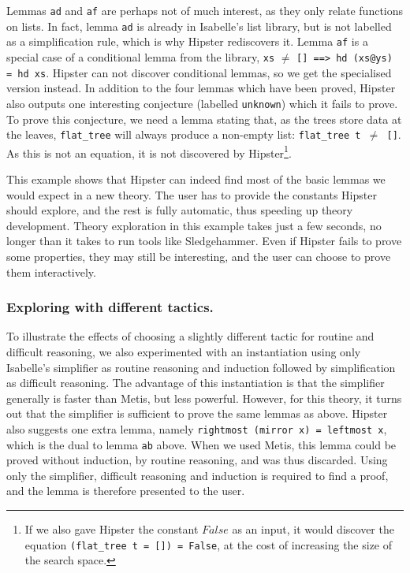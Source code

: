 Lemmas \texttt{ad} and \texttt{af} are perhaps not of much interest,
as they only relate functions on lists. In fact, lemma \texttt{ad} is
already in Isabelle's list library, but is not labelled as a
simplification rule, which is why Hipster rediscovers it. Lemma
\texttt{af} is a special case of a conditional lemma from the library,
\verb|xs| $\neq$ \verb|[] ==> hd (xs@ys) = hd xs|. Hipster can not
discover conditional lemmas, so we get the specialised version instead. In addition to the four lemmas which have been proved, Hipster also outputs one interesting conjecture (labelled \texttt{unknown}) which it fails to prove. To prove this conjecture, we need a lemma stating that, as the trees store data at the leaves, \texttt{flat\_tree} will always produce a non-empty list:
 \texttt{flat\_tree t $\neq$ []}. As this is not an equation, it is
 not discovered by Hipster\footnote{If we also gave Hipster the
   constant $False$ as an input, it would discover the equation
  \texttt{(flat\_tree t = []) = False}, at the cost of increasing
  the size of the search space.}.
 
This example shows that Hipster can indeed find most of the basic lemmas we would expect in a new theory. The user has to provide the constants Hipster should explore, and the rest is fully automatic, thus speeding up theory development.  Theory exploration in this example takes just a few seconds, no longer than it takes to run tools like Sledgehammer. Even if Hipster fails to prove some properties, they may still be interesting, and the user can choose to prove them interactively.

\subsubsection*{Exploring with different tactics.}
To illustrate the effects of choosing a slightly different tactic for routine and difficult reasoning, we also experimented with an instantiation using only Isabelle's simplifier as routine reasoning and induction followed by simplification as difficult reasoning. The advantage of this instantiation is that the simplifier generally is faster than Metis, but less powerful. However, for this theory, it turns out that the simplifier is sufficient to prove the same lemmas as above. Hipster also suggests one extra lemma, namely \texttt{rightmost (mirror x) = leftmost x}, which is the dual to lemma \texttt{ab} above. When we used Metis, this lemma could be proved without induction, by routine reasoning, and was thus discarded. Using only the simplifier, difficult reasoning and induction is required to find a proof, and the lemma is therefore presented to the user. 

